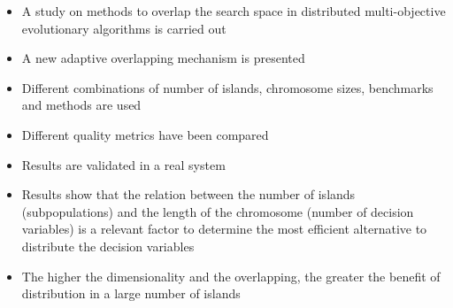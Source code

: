 \documentclass{article}
\begin{document}




\begin{itemize}
\item A study on methods to overlap the search space in distributed multi-objective evolutionary algorithms is carried out
\item A new adaptive overlapping mechanism is presented
\item Different combinations of number of islands, chromosome sizes, benchmarks and methods are used
\item Different quality metrics have been compared
\item Results are validated in a real system
\item Results show that the relation between the number of islands (subpopulations) and the length of the chromosome (number of decision variables) is a relevant factor to determine the most efficient alternative to distribute the decision variables
\item The higher the dimensionality and the overlapping, the greater the benefit of distribution in a large number of islands
\end{itemize}
\end{document}
